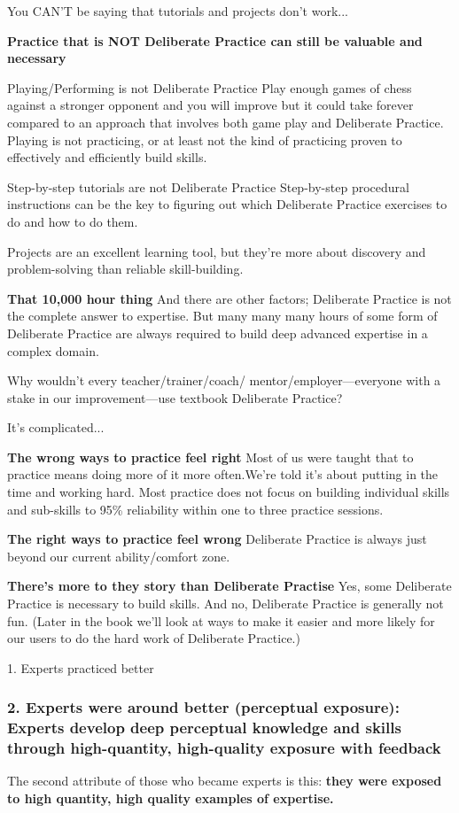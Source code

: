 You CAN’T be saying that tutorials and projects don’t work...

\textbf{Practice that is NOT Deliberate Practice can still be valuable and necessary}

Playing/Performing is not Deliberate Practice
Play enough games of chess against a stronger opponent and you will improve but it could take forever compared to an approach that involves both game play and Deliberate Practice. Playing is not practicing, or at least not the kind of practicing proven to effectively and efficiently build skills.

Step-by-step tutorials are not Deliberate Practice
Step-by-step procedural instructions can be the key to figuring out which Deliberate Practice exercises to do and how to do them.

Projects are an excellent learning tool, but they’re more about discovery and problem-solving than reliable skill-building.

\textbf{That 10,000 hour thing}
And there are other factors; Deliberate Practice is not the complete answer to expertise. But many many many hours of some form of Deliberate Practice are always required to build deep advanced expertise in a complex domain.

Why wouldn’t every teacher/trainer/coach/ mentor/employer—everyone with a stake in our improvement—use textbook Deliberate Practice?

It's complicated...

\textbf{The wrong ways to practice feel right}
Most of us were taught that to practice means doing more of it more often.We’re told it’s about putting in the time and working hard. Most practice does not focus on building individual skills and sub-skills to 95\% reliability within one to three practice sessions.

\textbf{The right ways to practice feel wrong}
Deliberate Practice is always just beyond our current ability/comfort zone.

\textbf{There's more to they story than Deliberate Practise}
Yes, some Deliberate Practice is necessary to build skills. And no, Deliberate Practice is generally not fun. (Later in the book we’ll look at ways to make it easier and more likely for our users to do the hard work of Deliberate Practice.)

1. Experts practiced better

\subsubsection{2. Experts were around better (perceptual exposure): Experts develop deep perceptual knowledge and skills through high-quantity, high-quality exposure with feedback}
The second attribute of those who became experts is this: \textbf{they were exposed to high quantity, high quality examples of expertise.}

